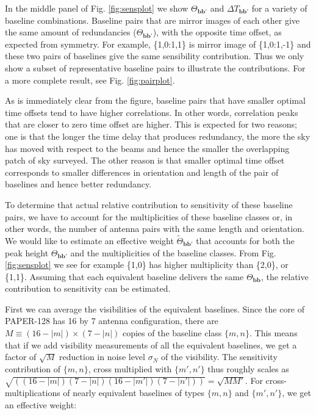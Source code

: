 \documentclass[twocolumn,apj,numberedappendix]{emulateapj}
\renewcommand\[{\begin{equation}}
\renewcommand\]{\end{equation}}
\begin{document}
In the middle panel of Fig. \ref{fig:sensplot}
we show $\Theta_{\boldsymbol{bb'}}$ and $\Delta T_{\boldsymbol{bb'}}$ for a variety of baseline combinations. Baseline pairs that are mirror images of each other 
give the same amount of redundancies ($\Theta_{\boldsymbol{bb'}}$), with the opposite time offset, as expected from symmetry. 
For example, \{1,0:1,1\} is mirror image of \{1,0:1,-1\} and these two pairs of baselines
give the same sensibility contribution. Thus we only show a subset of representative baseline pairs to illustrate the contributions. For a more complete result, see Fig. \ref{fig:pairplot}.  

As is immediately clear from the figure, baseline pairs that have smaller optimal time offsets
tend to have higher correlations. In other words, correlation peaks
that are closer to zero time offset are higher. This is expected for two reasons;
one is that the longer the time delay that produces redundancy, the more the sky has moved with respect
to the beams and hence the smaller the overlapping patch of sky surveyed. The other reason is that smaller optimal
time offset corresponds to smaller differences in orientation and length of the pair of baselines and hence better redundancy. 


To determine that actual relative contribution to sensitivity of these
baseline pairs, we have to account for the multiplicities of
these baseline classes or, in other words, the number of antenna pairs with the
same length and orientation. We would like to estimate an effective weight $\widetilde{\Theta}_{\boldsymbol{bb'}}$ that accounts for both the peak height $\Theta_{\boldsymbol{bb'}}$ and the multiplicities of the baseline classes. From Fig. \ref{fig:sensplot}
we see for example \{1,0\} has higher multiplicity than \{2,0\},
or \{1,1\}. Assuming that each equivalent baseline delivers
the same $\Theta_{\boldsymbol{bb}}$, the relative contribution to sensitivity can be estimated. 

First we can average the visibilities of the equivalent baselines. Since the core of PAPER-128 has 16 by 7 antenna configuration, there
are $M\equiv(16-|m|)\times(7-|n|)$ copies of the baseline class $\{m,n\}$. This means
that if we add visibility measurements of all the equivalent baselines,
we get a factor of $\sqrt{M}$ reduction in noise
level $\sigma_N$ of the visibility. The sensitivity contribution of $\{m,n\}$, cross multiplied with $\{m',n'\}$  thus roughly scales as $\sqrt{\left((16-|m|)(7-|n|)(16-|m'|)(7-|n'|)\right)}=\sqrt{MM'}$.
For cross-multiplications of nearly equivalent baselines of
types $\{m,n\}$ and $\{m',n'\}$, we get an effective weight: 
\end{document}
